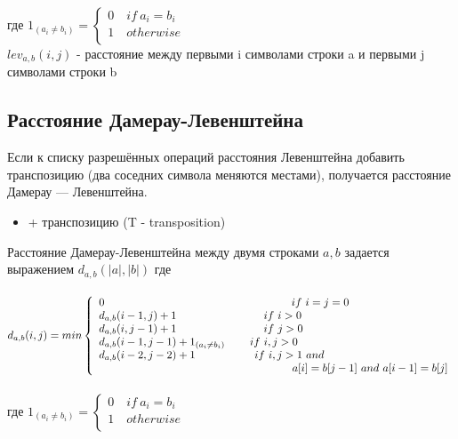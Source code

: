 где
$
1 _ {(a_i \ne b_i)} = \left\{
    \begin{array}{ll}
        0 \quad if \ a_i = b_i\\
        1 \quad otherwise\\
    \end{array}
    \right.
$\\

$lev_{a,b}(i,j)$ -
расстояние между первыми i символами строки a и первыми j символами строки b

\pagebreak
\subsection{Расстояние Дамерау-Левенштейна}

Если к списку разрешённых операций расстояния Левенштейна добавить
транспозицию (два соседних символа меняются местами),
получается расстояние Дамерау — Левенштейна.


\begin{itemize}
    \setlength{\itemsep}{0em}
    \item + транспозицию (T - transposition)
\end{itemize}

Расстояние  Дамерау-Левенштейна между двумя строками $a, b$ задается выражением $d_{a,b}(|a|,|b|)$ где
\\\\
$
d_{a,b}(i,j) = min\left\{
    \begin{array}{ll}
        0        \hspace{6cm} if \ i=j=0\\
        d_{a,b}(i-1,j) + 1    \hspace{2.8cm} if \ i>0\\
        d_{a,b}(i,j-1) + 1    \hspace{2.8cm} if \ j>0\\
        d_{a,b}(i-1,j-1) + 1_{(a_i \ne b_i)}
        \hspace{0.8cm} if \ i,j>0\\
        d_{a,b}(i-2,j-2) + 1
        \hspace{1.9cm} if \ i,j>1 \ and \\
        \hspace{6.2cm} a[i]=b[j-1] \ and \ a[i-1]=b[j]\\
    \end{array}
\right.
$\\\\

где
$
1 _ {(a_i \ne b_i)} = \left\{
    \begin{array}{ll}
        0 \quad if \ a_i = b_i\\
        1 \quad otherwise\\
    \end{array}
    \right.
$\\\\


